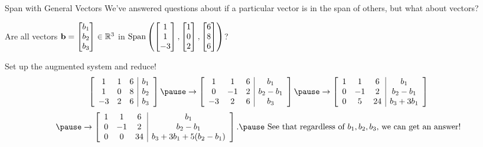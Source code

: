 \documentclass[xcoler=dvipsnames, aspectratio=169]{beamer}
\begin{document}
    \begin{frame}{Span with General Vectors}
        \scriptsize
        We've answered questions about if a particular vector is in the span of others, but what
        about  vectors?
        \pause
        \begin{example}
            Are all vectors $\mathbf{b}=\begin{bmatrix}b_1\\b_2\\b_3\end{bmatrix}\in\mathbb{R}^3$ in
            $\text{Span}\left(
                \begin{bmatrix}
                    1\\1\\-3
                \end{bmatrix}, \begin{bmatrix}
                    1\\0\\2
                \end{bmatrix}, \begin{bmatrix}
                    6\\8\\6
                \end{bmatrix}
            \right)$?
        \end{example}
        \pause
        \begin{solution}
            Set up the augmented system and reduce!
            \[
                \aMat{ccc|c}{
                    1&1&6&b_1\\
                    1&0&8&b_2\\
                    -3&2&6&b_3
                }\pause\rightarrow\aMat{ccc|c}{
                    1&1&6&b_1\\
                    0&-1&2&b_2-b_1\\
                    -3&2&6&b_3
                }\pause\rightarrow\aMat{ccc|c}{
                    1&1&6&b_1\\
                    0&-1&2&b_2-b_1\\
                    0&5&24&b_3+3b_1
                }
            \]
            \[
                \pause\rightarrow\aMat{ccc|c}{
                    1&1&6&b_1\\
                    0&-1&2&b_2-b_1\\
                    0&0&34&b_3+3b_1+5(b_2-b_1)
                }.\pause\textnormal{ See that regardless of $b_1,b_2,b_3$, we can get an answer!}
            \]
        \end{solution}
    \end{frame}
\end{document}
